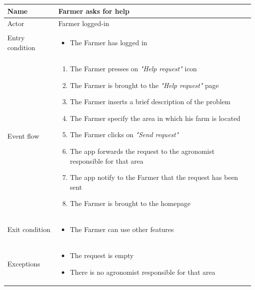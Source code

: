 \begin{table}[H]
    \begin{tabu} to \textwidth {|X|X[4]|}
        \hline
        Name            & Farmer asks for help          \\ \hline
        Actor           & Farmer logged-in   \\ \hline
        Entry condition & \begin{itemize}
            \item The Farmer has logged in
        \end{itemize} \\ \hline
        Event flow      & \begin{enumerate}
            \item The Farmer presses on \emph{"Help request"} icon
            \item The Farmer is brought to the \emph{"Help request"} page
            \item The Farmer inserts a brief description of the problem
            \item The Farmer specify the area in which his farm is located
            \item The Farmer clicks on \emph{"Send request"}
            \item The app forwards the request to the agronomist responsible for that area
            \item The app notify to the Farmer that the request has been sent
            \item The Farmer is brought to the homepage
        \end{enumerate} \\ \hline
        Exit condition  & \begin{itemize}
            \item The Farmer can use other features
        \end{itemize} \\ \hline
        Exceptions      & \begin{itemize}
            \item The request is empty
            \item There is no agronomist responsible for that area
        \end{itemize} \\ \hline
    \end{tabu}
\end{table}

